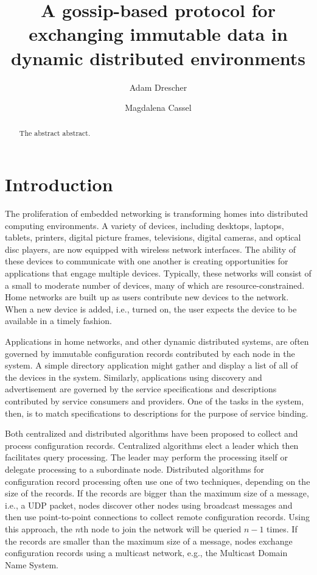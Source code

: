 \documentclass[letterpaper]{article}
\begin{document}
\title{A gossip-based protocol for exchanging immutable data in dynamic distributed environments}
\author{Adam Drescher \and Magdalena Cassel}
\date{}

\maketitle

\begin{abstract}
The abstract abstract.
\end{abstract}

\section{Introduction}
The proliferation of embedded networking is transforming homes into distributed computing environments.
A variety of devices, including desktops, laptops, tablets, printers, digital picture frames, televisions, digital cameras, and optical disc players, are now equipped with wireless network interfaces.
The ability of these devices to communicate with one another is creating opportunities for applications that engage multiple devices.
Typically, these networks will consist of a small to moderate number of devices, many of which are resource-constrained.
Home networks are built up as users contribute new devices to the network.
When a new device is added, i.e., turned on, the user expects the device to be available in a timely fashion.

Applications in home networks, and other dynamic distributed systems, are often governed by immutable configuration records contributed by each node in the system.
A simple directory application might gather and display a list of all of the devices in the system.
Similarly, applications using discovery and advertisement are governed by the service specifications and descriptions contributed by service consumers and providers.
One of the tasks in the system, then, is to match specifications to descriptions for the purpose of service binding.

Both centralized and distributed algorithms have been proposed to collect and process configuration records.
Centralized algorithms elect a leader which then facilitates query processing.
The leader may perform the processing itself or delegate processing to a subordinate node.
Distributed algorithms for configuration record processing often use one of two techniques, depending on the size of the records.
If the records are bigger than the maximum size of a message, i.e., a UDP packet, nodes discover other nodes using broadcast messages and then use point-to-point connections to collect remote configuration records.
Using this approach, the $n$th node to join the network will be queried $n-1$ times.
If the records are smaller than the maximum size of a message, nodes exchange configuration records using a multicast network, e.g., the Multicast Domain Name System.
\end{document}
